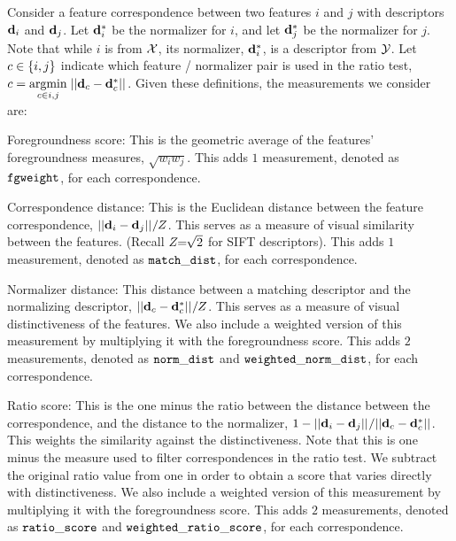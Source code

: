 Consider a feature correspondence between two features $i$ and $j$ with descriptors $\mathbf{d}_i$ and $\mathbf{d}_j$.
Let $\mathbf{d}^{*}_i$ be the normalizer for $i$, and let $\mathbf{d}^{*}_j$ be the normalizer for $j$.
Note that while $i$ is from $\mathcal{X}$, its normalizer, $\mathbf{d}^{*}_i$, is a descriptor from $\mathcal{Y}$.
Let $c \in \left\{i, j\right\}$ indicate which feature / normalizer pair is used in the ratio test, %
$c = \underset{c \in {i, j}}{\operatorname{argmin}}\;{||\mathbf{d}_c - \mathbf{d}^{*}_c||_{}}$.
Given these definitions, the measurements we consider are:

\begin{itemln}

    \item Foregroundness score:
    This is the geometric average of the features' foregroundness measures, $\sqrt{w_i w_j}$.
    This adds $1$ measurement, denoted as $\tt{fgweight}$, for each correspondence.

    \item Correspondence distance:
    This is the Euclidean distance between the feature correspondence, $||\mathbf{d}_i - \mathbf{d}_j||_{} / Z$.
    This serves as a measure of visual similarity between the features.
    (Recall $Z\mkern-6mu=\mkern-6mu\sqrt{2}$ for SIFT descriptors).
    This adds $1$ measurement, denoted as $\tt{match\_dist}$, for each correspondence.

    \item Normalizer distance:
    This distance between a matching descriptor and the normalizing descriptor, %
        $||\mathbf{d}_c - \mathbf{d}^{*}_c||_{} / Z$.
        This serves as a measure of visual distinctiveness of the features.
    We also include a weighted version of this measurement by multiplying it with the foregroundness score.
    This adds $2$ measurements, denoted as $\tt{norm\_dist}$ and $\tt{weighted\_norm\_dist}$, for each correspondence.

    \item Ratio score:
    This is the one minus the ratio between the distance between the correspondence, and the distance to the
      normalizer, %
    $1 - ||\mathbf{d}_i - \mathbf{d}_j||_{} / ||\mathbf{d}_c - \mathbf{d}^{*}_c||_{}$.
    This weights the similarity against the distinctiveness.
    Note that this is one minus the measure used to filter correspondences in the ratio test.
    We subtract the original ratio value from one in order to obtain a score that varies directly with
      distinctiveness.
    We also include a weighted version of this measurement by multiplying it with the foregroundness score.
    This adds $2$ measurements, denoted as $\tt{ratio\_score}$ and $\tt{weighted\_ratio\_score}$, for each correspondence.
        

\end{itemln}
